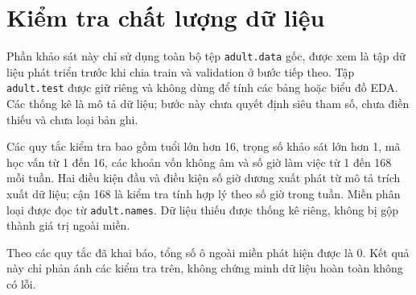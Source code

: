 \section{Kiểm tra chất lượng dữ liệu}
\label{sec:3_3}
Phần khảo sát này chỉ sử dụng toàn bộ tệp \texttt{adult.data} gốc, được xem là tập dữ liệu phát triển trước khi chia train và validation ở bước tiếp theo. Tập \texttt{adult.test} được giữ riêng và không dùng để tính các bảng hoặc biểu đồ EDA. Các thống kê là mô tả dữ liệu; bước này chưa quyết định siêu tham số, chưa điền thiếu và chưa loại bản ghi.

Các quy tắc kiểm tra bao gồm tuổi lớn hơn 16, trọng số khảo sát lớn hơn 1, mã học vấn từ 1 đến 16, các khoản vốn không âm và số giờ làm việc từ 1 đến 168 mỗi tuần. Hai điều kiện đầu và điều kiện số giờ dương xuất phát từ mô tả trích xuất dữ liệu; cận 168 là kiểm tra tính hợp lý theo số giờ trong tuần. Miền phân loại được đọc từ \texttt{adult.names}. Dữ liệu thiếu được thống kê riêng, không bị gộp thành giá trị ngoài miền.

Theo các quy tắc đã khai báo, tổng số ô ngoài miền phát hiện được là 0. Kết quả này chỉ phản ánh các kiểm tra trên, không chứng minh dữ liệu hoàn toàn không có lỗi.




